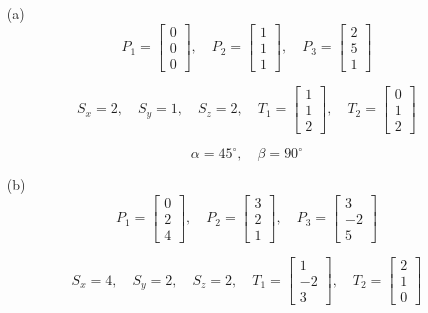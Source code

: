 \begin{enumerate}
    \item[(a)] 
    \[
    P_1 = \begin{bmatrix} 0 \\ 0 \\ 0 \end{bmatrix}, 
    \quad P_2 = \begin{bmatrix} 1 \\ 1 \\ 1 \end{bmatrix}, 
    \quad P_3 = \begin{bmatrix} 2 \\ 5 \\ 1 \end{bmatrix}
    \]

    \[
    S_x = 2, \quad S_y = 1, \quad S_z = 2, 
    \quad T_1 = \begin{bmatrix} 1 \\ 1 \\ 2 \end{bmatrix}, 
    \quad T_2 = \begin{bmatrix} 0 \\ 1 \\ 2 \end{bmatrix}
    \]

    \[
    \alpha = 45^\circ, \quad \beta = 90^\circ
    \]

    \item[(b)] 
    \[
    P_1 = \begin{bmatrix} 0 \\ 2 \\ 4 \end{bmatrix}, 
    \quad P_2 = \begin{bmatrix} 3 \\ 2 \\ 1 \end{bmatrix}, 
    \quad P_3 = \begin{bmatrix} 3 \\ -2 \\ 5 \end{bmatrix}
    \]

    \[
    S_x = 4, \quad S_y = 2, \quad S_z = 2, 
    \quad T_1 = \begin{bmatrix} 1 \\ -2 \\ 3 \end{bmatrix}, 
    \quad T_2 = \begin{bmatrix} 2 \\ 1 \\ 0 \end{bmatrix}
    \]


\end{enumerate}
